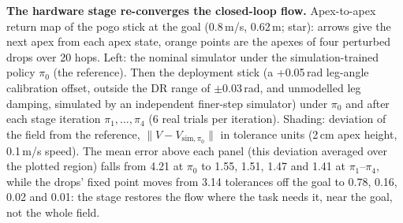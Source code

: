 \caption{\textbf{The hardware stage re-converges the closed-loop flow.} Apex-to-apex return map of the pogo stick at the
goal (0.8\,m/s, 0.62\,m; star): arrows give the next apex from each apex state, orange points are the apexes of four
perturbed drops over 20 hops. Left: the nominal simulator under the simulation-trained policy $\pi_0$ (the reference).
Then the deployment stick (a +0.05\,rad leg-angle calibration offset, outside the DR range of $\pm$0.03\,rad, and
unmodelled leg damping, simulated by an independent finer-step simulator) under $\pi_0$ and after each stage
iteration $\pi_1,\dots,\pi_4$ (6 real trials per iteration). Shading: deviation of the field from the reference,
$\lVert V - V_{\mathrm{sim},\pi_0}\rVert$ in tolerance units (2\,cm apex height, 0.1\,m/s speed). The mean error above each panel (this deviation
averaged over the plotted region) falls from 4.21 at $\pi_0$ to 1.55, 1.51, 1.47 and 1.41 at $\pi_1$--$\pi_4$, while the drops'
fixed point moves from 3.14 tolerances off the goal to 0.78, 0.16, 0.02 and 0.01: the stage restores the flow where
the task needs it, near the goal, not the whole field.}
